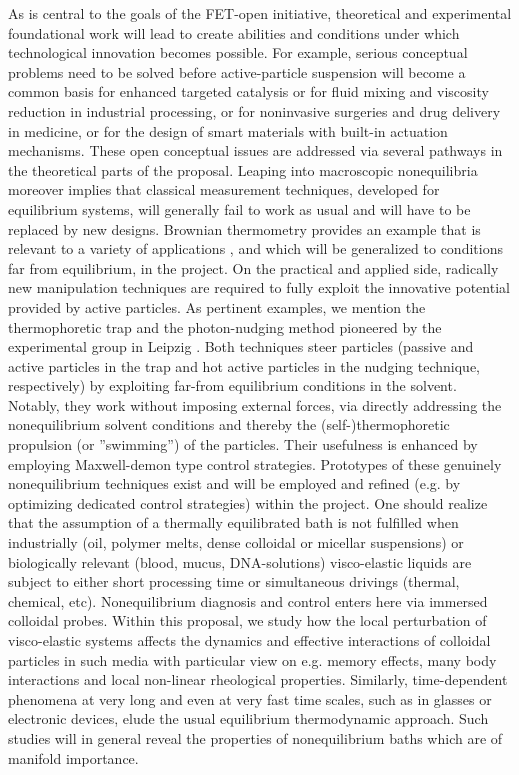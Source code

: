  As is central to the goals
of the FET-open initiative, theoretical and experimental foundational work will lead to
create abilities and conditions under which technological innovation becomes possible.  For
example, serious conceptual problems need to be solved before active-particle suspension
will become a common basis for enhanced targeted catalysis or for fluid mixing and viscosity
reduction in industrial processing, or for noninvasive surgeries and drug delivery in
medicine, or for the design of smart materials with built-in actuation mechanisms. These
open conceptual issues are addressed via several pathways in the theoretical parts of the
proposal.  Leaping into macroscopic nonequilibria moreover implies that classical
measurement techniques, developed for equilibrium systems, will generally fail to work as
usual and will have to be replaced by new designs. Brownian thermometry provides an example
that is relevant to a variety of applications \cite{kroy:2014}, and which will be
generalized to conditions far from equilibrium, in the project.  On the practical and
applied side, radically new manipulation techniques are required to fully exploit the
innovative potential provided by active particles. As pertinent examples, we mention the
thermophoretic trap and the photon-nudging method pioneered by the experimental group in
Leipzig \cite{Qian2013,Braun:NanoLetters:2015}.  Both techniques steer particles (passive
and active particles in the trap and hot active particles in the nudging technique,
respectively) by exploiting far-from equilibrium conditions in the solvent. Notably, they
work without imposing external forces, via directly addressing the nonequilibrium solvent
conditions and thereby the (self-)thermophoretic propulsion (or ''swimming'') of the
particles. Their usefulness is enhanced by employing Maxwell-demon type control
strategies. Prototypes of these genuinely nonequilibrium techniques exist and will be
employed and refined (e.g. by optimizing dedicated control strategies) within the project.
%
One should realize that the assumption of a thermally equilibrated bath is not fulfilled
when industrially (oil, polymer melts, dense colloidal or micellar suspensions) or
biologically relevant (blood, mucus, DNA-solutions) visco-elastic liquids are subject to
either short processing time or simultaneous drivings (thermal, chemical,
etc). Nonequilibrium diagnosis and control enters here via immersed colloidal probes.
%
Within this proposal, we
study how the local perturbation of visco-elastic systems affects the dynamics and
effective interactions of colloidal particles in such media with particular view on
e.g. memory effects, many body interactions and local non-linear rheological properties.
Similarly, time-dependent phenomena at very long and even at very fast time scales, such as
in glasses or electronic devices, elude the usual equilibrium thermodynamic
approach.  Such studies will in general reveal the properties of nonequilibrium baths which
are of manifold importance.

